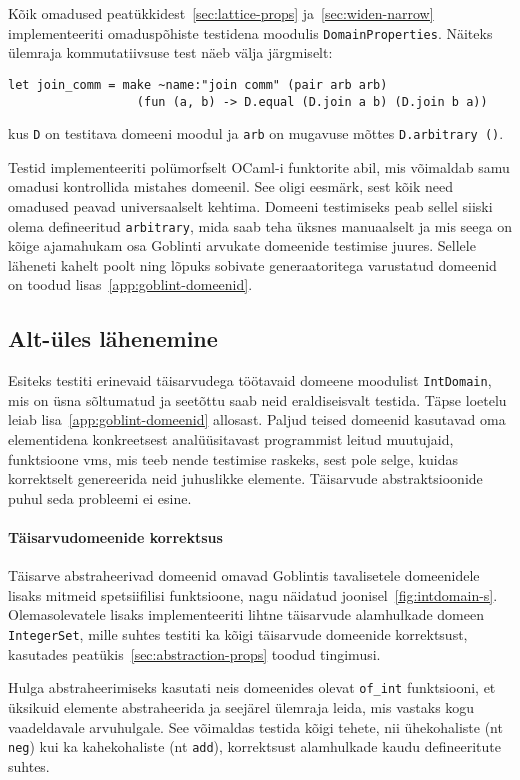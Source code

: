 \documentclass[../thesis.tex]{subfiles}
\begin{document}
Kõik omadused peatükkidest~\ref{sec:lattice-props} ja~\ref{sec:widen-narrow} implementeeriti omaduspõhiste testidena moodulis \texttt{DomainProperties}. Näiteks ülemraja kommutatiivsuse test näeb välja järgmiselt:
\begin{verbatim}
let join_comm = make ~name:"join comm" (pair arb arb)
                  (fun (a, b) -> D.equal (D.join a b) (D.join b a))
\end{verbatim}
kus \texttt{D} on testitava domeeni moodul ja \texttt{arb} on mugavuse mõttes \texttt{D.arbitrary ()}.

Testid implementeeriti polümorfselt OCaml-i funktorite abil, mis võimaldab samu omadusi kontrollida mistahes domeenil. See oligi eesmärk, sest kõik need omadused peavad universaalselt kehtima. Domeeni testimiseks peab sellel siiski olema defineeritud \texttt{arbitrary}, mida saab teha üksnes manuaalselt ja mis seega on kõige ajamahukam osa Goblinti arvukate domeenide testimise juures. Sellele läheneti kahelt poolt ning lõpuks sobivate generaatoritega varustatud domeenid on toodud lisas~\ref{app:goblint-domeenid}.

\subsection{Alt-üles lähenemine}
Esiteks testiti erinevaid täisarvudega töötavaid domeene moodulist \texttt{IntDomain}, mis on üsna sõltumatud ja seetõttu saab neid eraldiseisvalt testida. Täpse loetelu leiab lisa~\ref{app:goblint-domeenid} allosast. Paljud teised domeenid kasutavad oma elementidena konkreetsest analüüsitavast programmist leitud muutujaid, funktsioone vms, mis teeb nende testimise raskeks, sest pole selge, kuidas korrektselt genereerida neid juhuslikke elemente. Täisarvude abstraktsioonide puhul seda probleemi ei esine.

\paragraph{Täisarvudomeenide korrektsus}
Täisarve abstraheerivad domeenid omavad Goblintis tavalisetele domeenidele lisaks mitmeid spetsiifilisi funktsioone, nagu näidatud joonisel~\ref{fig:intdomain-s}.
Olemasolevatele lisaks implementeeriti lihtne täisarvude alamhulkade domeen \texttt{IntegerSet}, mille suhtes testiti ka kõigi täisarvude domeenide korrektsust, kasutades peatükis~\ref{sec:abstraction-props} toodud tingimusi.

Hulga abstraheerimiseks kasutati neis domeenides olevat \texttt{of\_int} funktsiooni, et üksikuid elemente abstraheerida ja seejärel ülemraja leida, mis vastaks kogu vaadeldavale arvuhulgale. See võimaldas testida kõigi tehete, nii ühekohaliste (nt \texttt{neg}) kui ka kahekohaliste (nt \texttt{add}), korrektsust alamhulkade kaudu defineeritute suhtes.
\end{document}

